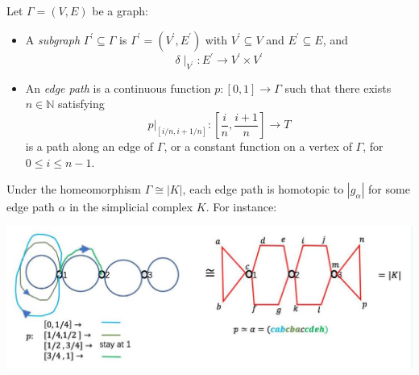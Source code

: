 \begin{definition}
Let $\Gamma = (V,E)$ be a graph:
\begin{itemize}
\item A \emph{subgraph} \({\Gamma }^{\prime } \subseteq  \Gamma\) is \({\Gamma }^{\prime } = \left( {{V}^{\prime },{E}^{\prime }}\right)\) with \({V}^{\prime } \subseteq  V\) and \({E}^{\prime } \subseteq  E\), and
\[
\delta { \mid  }_{{V}^{\prime }}: {E}^{\prime } \rightarrow  {V}^{\prime } \times  {V}^{\prime }
\]
\item An \emph{edge path} is a continuous function \(p: \left\lbrack  {0,1}\right\rbrack   \rightarrow  \Gamma\) such that there exists \(n \in  \mathbb{N}\) satisfying
\[
{\left. p\right| }_{\left\lbrack  i/n,i + 1/n\right\rbrack  }: \left\lbrack  {\frac{i}{n},\frac{i + 1}{n}}\right\rbrack   \rightarrow  T
\]
is a path along an edge of \(\Gamma\), or a constant function on a vertex of \(\Gamma\), for \(0 \leq  i \leq  n - 1\).
\end{itemize}
\end{definition}

Under the homeomorphism \(\Gamma  \cong  \left| K\right|\), each edge path is homotopic to \(\left| {g}_{\alpha }\right|\) for some edge path \(\alpha\) in the simplicial complex \(K\). For instance:
\begin{center}
\includegraphics[width=1\textwidth]{images/Ch8_edge_path_approx.jpg}
\end{center}

